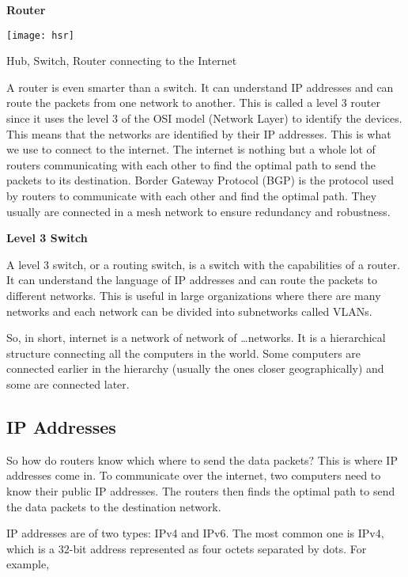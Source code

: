 \textbf{Router}

\begin{marginfigure}
\texttt{[image: hsr]}
\caption{Hub, Switch, Router connecting to the Internet}
\end{marginfigure}

A router is even smarter than a switch. It can
understand IP addresses and can route the packets
from one network to another. This is called a level 3
router since it uses the level 3 of the OSI model
(Network Layer) to identify the devices. This means
that the networks are identified by their IP addresses.
This is what we use to connect to the internet.
The internet is nothing but a whole lot of routers
communicating with each other to find the optimal
path to send the packets to its destination.
Border Gateway Protocol (BGP) is the protocol used
by routers to communicate with each other and find
the optimal path. They usually are connected in a
mesh network to ensure redundancy and robustness.

\textbf{Level 3 Switch}

A level 3 switch, or a routing switch, is a switch
with the capabilities of a router. It can understand
the language of IP addresses and can route the packets
to different networks. This is useful in large
organizations where there are many networks and
each network can be divided into subnetworks called
VLANs.


So, in short, internet is a network of network
of \dots networks. It is a hierarchical structure
connecting all the computers in the world.
Some computers are connected earlier in the
hierarchy (usually the ones closer geographically)
and some are connected later.

\subsection{IP Addresses}

So how do routers know which where to send the
data packets? This is where IP addresses come in.
To communicate over the internet, two computers
need to know their public IP addresses. The routers
then finds the optimal path to send the data packets
to the destination network.

IP addresses are of two types: IPv4 and IPv6.
The most common one is IPv4, which is a 32-bit
address represented as four octets separated by
dots. For example,

